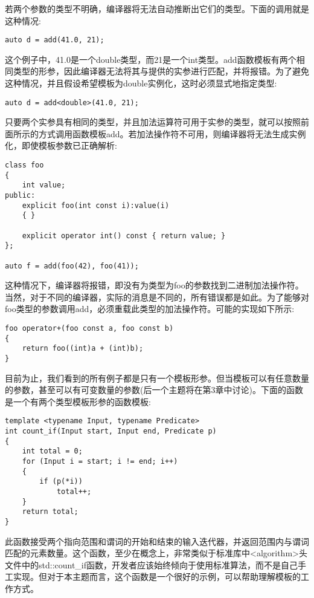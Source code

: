 若两个参数的类型不明确，编译器将无法自动推断出它们的类型。下面的调用就是这种情况:

\begin{lstlisting}[style=styleCXX]
auto d = add(41.0, 21);
\end{lstlisting}

这个例子中，41.0是一个double类型，而21是一个int类型。add函数模板有两个相同类型的形参，因此编译器无法将其与提供的实参进行匹配，并将报错。为了避免这种情况，并且假设希望模板为double实例化，这时必须显式地指定类型:

\begin{lstlisting}[style=styleCXX]
auto d = add<double>(41.0, 21);
\end{lstlisting}

只要两个实参具有相同的类型，并且加法运算符可用于实参的类型，就可以按照前面所示的方式调用函数模板add。若加法操作符不可用，则编译器将无法生成实例化，即使模板参数已正确解析:

\begin{lstlisting}[style=styleCXX]
class foo
{
	int value;
public:
	explicit foo(int const i):value(i)
	{ }
	
	explicit operator int() const { return value; }
};

auto f = add(foo(42), foo(41));
\end{lstlisting}

这种情况下，编译器将报错，即没有为类型为foo的参数找到二进制加法操作符。当然，对于不同的编译器，实际的消息是不同的，所有错误都是如此。为了能够对foo类型的参数调用add，必须重载此类型的加法操作符。可能的实现如下所示:

\begin{lstlisting}[style=styleCXX]
foo operator+(foo const a, foo const b)
{
	return foo((int)a + (int)b);
}
\end{lstlisting}

目前为止，我们看到的所有例子都是只有一个模板形参。但当模板可以有任意数量的参数，甚至可以有可变数量的参数(后一个主题将在第3章中讨论)。下面的函数是一个有两个类型模板形参的函数模板:

\begin{lstlisting}[style=styleCXX]
template <typename Input, typename Predicate>
int count_if(Input start, Input end, Predicate p)
{
	int total = 0;
	for (Input i = start; i != end; i++)
	{
		if (p(*i))
			total++;
	}
	return total;
}
\end{lstlisting}

此函数接受两个指向范围和谓词的开始和结束的输入迭代器，并返回范围内与谓词匹配的元素数量。这个函数，至少在概念上，非常类似于标准库中<algorithm>头文件中的std::count\_if函数，开发者应该始终倾向于使用标准算法，而不是自己手工实现。但对于本主题而言，这个函数是一个很好的示例，可以帮助理解模板的工作方式。

